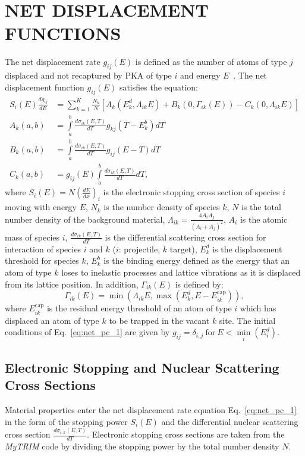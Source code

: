 \documentclass[letterpaper]{mandc2019}
\begin{document}
\section{NET DISPLACEMENT FUNCTIONS} \label{sec:disp_func}
The net displacement rate $g_{ij}(E)$ is defined as the number of atoms of type $j$ displaced and not recaptured by PKA of type $i$ and energy $E$~\cite{PC1981}.
The net displacement function $g_{ij}(E)$ satisfies the equation:
\begin{align}\label{eq:net_pc_1}
  S_{i}(E) \frac{d g_{ij}}{dE}  &= \sum\limits_{k=1}^K \frac{N_k}{N}   
  \left [ A_k(E_k^d, \Lambda_{ik} E) + B_k(0, \Gamma_{ik}(E)) - C_k(0, \Lambda_{ik} E)\right ]\nonumber \\
   A_k(a, b) &= \int\limits_{a}^{b}  \frac{d \sigma_{ik} (E,T)}{dT} g_{kj}(T-E_k^b)  dT \nonumber \\
   B_k(a, b) &= \int\limits_{a}^{b}  \frac{d \sigma_{ik} (E,T)}{dT}  g_{ij}(E-T) dT \nonumber \\
   C_k(a, b) &=  g_{ij}(E) \int\limits_{a}^{b}  \frac{d \sigma_{ik} (E,T)}{dT}   dT,
\end{align}
where $S_i(E) = N \left(\frac{dE}{dx}\right)_i$ is the electronic stopping cross section of species $i$ moving with energy $E$, $N_k$ is the number density of species $k$, $N$ is the total number density of the background material, $\Lambda_{ik} = \frac{4A_i A_j}{(A_i + A_j)^2}$, $A_i$ is the atomic mass of species $i$, $\frac{d \sigma_{ik} (E,T)}{dT}$ is the differential scattering cross section for interaction of species $i$ and $k$ ($i$: projectile, $k$ target), $E_k^d$ is the displacement threshold for species $k$, $E_k^b$ is the binding energy defined as the energy that an atom of type $k$ loses to inelastic processes and lattice vibrations as it is displaced from its lattice position. In addition, $\Gamma_{ik}(E)$ is defined by:
\[
\Gamma_{ik}(E) = \min \left( \Lambda_{ik} E, \max \left( E_k^d, E - E_{ik}^{\text{cap}} \right)  \right),
\]
where $E_{ik}^{\text{cap}}$ is the residual energy threshold of an atom of type $i$ which has displaced an atom of type $k$ to be trapped in the vacant $k$ site.
The initial conditions of Eq.~\ref{eq:net_pc_1} are given by $g_{ij}=\delta_{i,j}~\text{for}~E < \min\limits_i (E_i^d)$.

\subsection{Electronic Stopping and Nuclear Scattering Cross Sections}\label{sec:cross_section}
Material properties enter the net displacement rate equation Eq.~\ref{eq:net_pc_1} in the form of the stopping power $S_i(E)$ and the differential nuclear scattering cross section $\frac{d \sigma_{i,k}(E,T)}{d T}$.
Electronic stopping cross sections are taken from the \textit{MyTRIM} code by dividing the stopping power by the total number density $N$. 
\end{document}
